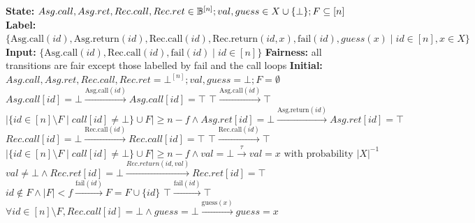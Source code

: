 \begin{transys}
    \label{PLTS:SRSD}
    \caption{Encoding of \textsf{SRSD}}
    \begin{algorithmic}
        \State \textbf{State:} $Asg.call, Asg.ret, Rec.call, Rec.ret \in \mathbb{B}^{[n]};
        val, guess \in X \cup \{\bot\}; F \subseteq [n]$
        \State \textbf{Label:} $\{\text{Asg.call}(id), \text{Asg.return}(id), \text{Rec.call}(id),
        \text{Rec.return}(id,x), \text{fail}(id), guess(x) \mid id \in [n], x \in X\}$
        \State \textbf{Input:} $\{\text{Asg.call}(id), \text{Rec.call}(id), \text{fail}(id) \mid
        id \in [n]\}$
        \State \textbf{Fairness:} all transitions are fair except those labelled by fail and the
        call loops
        \State \textbf{Initial:} $Asg.call, Asg.ret, Rec.call, Rec.ret = \bot^{[n]};
        val, guess = \bot; F = \emptyset$
        \medskip
        \State
        $Asg.call[id] = \bot
        \xrightarrow{\text{Asg.call}(id)}
        Asg.call[id] = \top$
        \State
        $\top
        \xrightarrow{\text{Asg.call}(id)}
        \top$ 
        \State
        $|\{id \in [n] \setminus F \mid call[id] \ne \bot\} \cup F| \ge n-f
        \wedge Asg.ret[id] = \bot
        \xrightarrow{\text{Asg.return}(id)}
        Asg.ret[id] = \top$
        \State
        $Rec.call[id] = \bot
        \xrightarrow{\text{Rec.call}(id)}
        Rec.call[id] = \top$
        \State
        $\top
        \xrightarrow{\text{Rec.call}(id)}
        \top$ 
        \State
        $|\{id \in [n] \setminus F \mid call[id] \ne \bot\} \cup F| \ge n-f
        \wedge val = \bot
        \xrightarrow{\tau}
        val = x \text{ with probability } |X|^{-1}$
        \State
        $val \ne \bot \wedge Rec.ret[id] = \bot
        \xrightarrow{Rec.return(id,val)}
        Rec.ret[id] = \top$
        \State
        $id \not\in F \wedge |F| < f
        \xrightarrow{\text{fail}(id)}
        F = F \cup \{id\}$
        \State
        $\top
        \xrightarrow{\text{fail}(id)}
        \top$ 
        \State
        $\forall id \in [n] \setminus F, Rec.call[id] = \bot \wedge guess = \bot
        \xrightarrow{\text{guess}(x)}
        guess = x$
    \end{algorithmic}
\end{transys}

